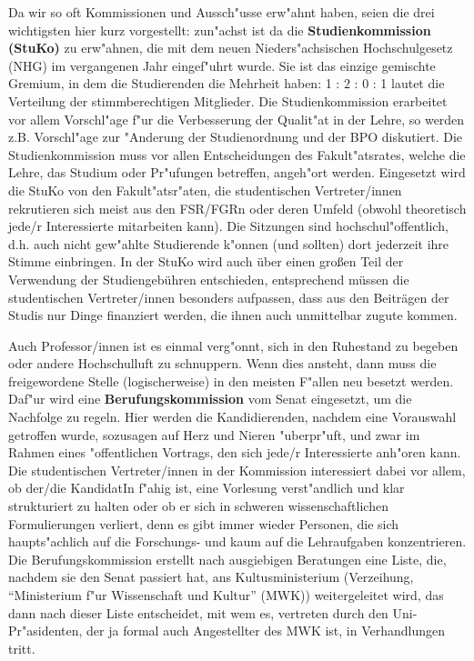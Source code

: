 Da wir so oft Kommissionen und Aussch"usse erw"ahnt haben, seien die drei 
wichtigsten hier kurz vorgestellt: zun"achst ist da die 
\textbf{Studienkommission (StuKo)} zu erw"ahnen, die mit dem neuen 
Nieders"achsischen Hochschulgesetz (NHG) im vergangenen Jahr eingef"uhrt wurde. 
Sie ist das einzige gemischte Gremium, in dem die Studierenden die Mehrheit 
haben: 1 : 2 : 0 : 1 lautet die Verteilung der stimmberechtigen Mitglieder. Die 
Studienkommission erarbeitet vor allem Vorschl"age f"ur die Verbesserung der 
Qualit"at in der Lehre, so werden z.B. Vorschl"age zur "Anderung der 
Studienordnung und der BPO diskutiert. Die Studienkommission muss vor allen 
Entscheidungen des Fakult"atsrates, welche die Lehre, das Studium oder 
Pr"ufungen betreffen, angeh"ort werden. Eingesetzt wird die StuKo von den 
Fakult"atsr"aten, die studentischen Vertreter/innen rekrutieren sich meist aus den 
FSR/FGRn oder deren Umfeld (obwohl theoretisch jede/r Interessierte mitarbeiten 
kann). Die Sitzungen sind hochschul"offentlich, d.h. auch nicht gew"ahlte 
Studierende k"onnen (und sollten) dort jederzeit ihre Stimme einbringen.
In der StuKo wird auch über einen großen Teil der Verwendung der Studiengebühren entschieden, 
entsprechend müssen die studentischen Vertreter/innen besonders aufpassen, dass 
aus den Beiträgen der Studis nur Dinge finanziert werden, die ihnen auch unmittelbar zugute kommen.


Auch Professor/innen ist es einmal verg"onnt, sich in den Ruhestand zu begeben oder 
andere Hochschulluft zu schnuppern. Wenn dies ansteht, dann muss die 
freigewordene Stelle (logischerweise) in den meisten F"allen neu besetzt 
werden. Daf"ur wird eine \textbf{Berufungskommission} vom Senat eingesetzt, um 
die Nachfolge zu regeln. Hier werden die Kandidierenden, nachdem eine Vorauswahl 
getroffen wurde, sozusagen auf Herz und Nieren "uberpr"uft, und zwar im Rahmen 
eines "offentlichen Vortrags, den sich jede/r Interessierte anh"oren kann. Die 
 studentischen Vertreter/innen in der Kommission interessiert dabei vor allem, ob 
der/die KandidatIn f"ahig ist, eine Vorlesung verst"andlich und klar 
strukturiert zu halten oder ob er sich in schweren wissenschaftlichen 
Formulierungen verliert, denn es gibt immer wieder Personen, die sich
haupts"achlich auf die Forschungs- und kaum auf die Lehraufgaben konzentrieren.
Die Berufungskommission 
erstellt nach ausgiebigen Beratungen eine Liste, die, nachdem sie den Senat 
passiert hat, ans Kultusministerium (Verzeihung, "`Ministerium f"ur 
Wissenschaft und Kultur"' (MWK)) weitergeleitet wird, das dann nach dieser 
Liste entscheidet, mit wem es, vertreten durch den Uni-Pr"asidenten, der ja 
formal auch Angestellter des MWK ist, in Verhandlungen tritt.

